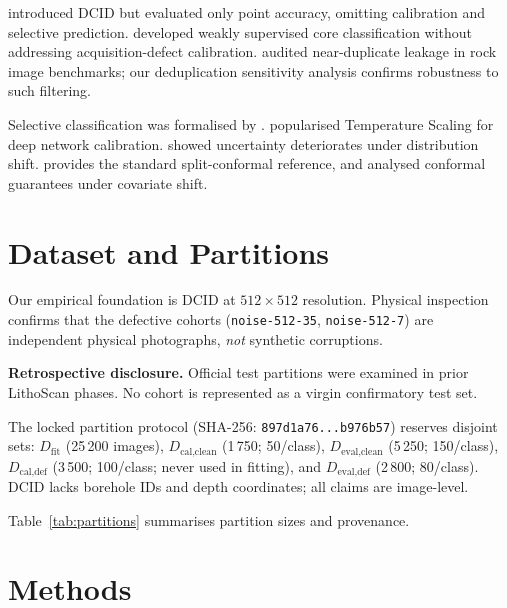 \documentclass[5p,times,twocolumn]{elsarticle}
\begin{document}
\citet{Li2025DCID} introduced DCID but evaluated only point accuracy, omitting calibration
and selective prediction.
\citet{Serdoun2026Weakly} developed weakly supervised core classification without addressing
acquisition-defect calibration.
\citet{Bourezgui2026NearDuplicate} audited near-duplicate leakage in rock image benchmarks;
our deduplication sensitivity analysis confirms robustness to such filtering.

Selective classification was formalised by \citet{Geifman2017Selective,Geifman2019Selectivenet}.
\citet{Guo2017Calibration} popularised Temperature Scaling for deep network calibration.
\citet{Ovadia2019DatasetShift} showed uncertainty deteriorates under distribution shift.
\citet{Angelopoulos2021Conformal} provides the standard split-conformal reference, and
\citet{Tibshirani2019CovariateShift} analysed conformal guarantees under covariate shift.

\section{Dataset and Partitions}
\label{sec:data}

Our empirical foundation is DCID \citep{Li2025DCID} at $512\times512$ resolution.
Physical inspection confirms that the defective cohorts (\texttt{noise-512-35},
\texttt{noise-512-7}) are independent physical photographs, \emph{not} synthetic corruptions.

\textbf{Retrospective disclosure.}
Official test partitions were examined in prior LithoScan phases.
No cohort is represented as a virgin confirmatory test set.

The locked partition protocol (SHA-256:
\texttt{897d1a76...b976b57}) reserves disjoint sets:
$D_{\text{fit}}$ (25\,200 images),
$D_{\text{cal,clean}}$ (1\,750; 50/class),
$D_{\text{eval,clean}}$ (5\,250; 150/class),
$D_{\text{cal,def}}$ (3\,500; 100/class; never used in fitting),
and $D_{\text{eval,def}}$ (2\,800; 80/class).
DCID lacks borehole IDs and depth coordinates; all claims are image-level.

Table~\ref{tab:partitions} summarises partition sizes and provenance.

\section{Methods}
\label{sec:methods}
\end{document}
